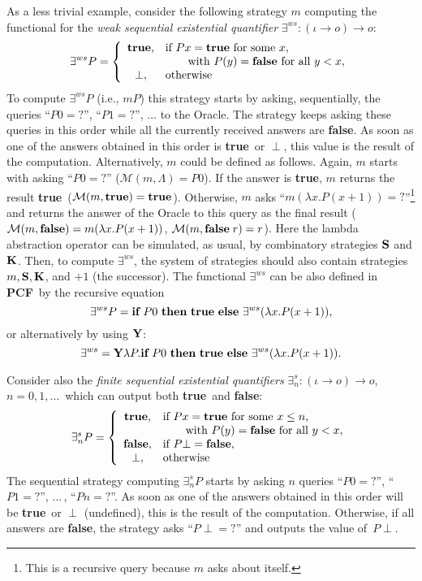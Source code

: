 \documentclass[fleqn]{LMCS}
\theoremstyle{plain}\newtheorem{satz}[thm]{Satz}
\theoremstyle{plain}\newtheorem{hyp}[thm]{Hypothesis}
\theoremstyle{plain}\newtheorem{hyps}[thm]{Hypotheses}
\theoremstyle{definition}\newtheorem{note}[thm]{Note}
\newcommand{\arr}{\rightarrow}
\newcommand{\PCF}{\mbox{\bf PCF}}
\newcommand{\K}{\mbox{\bf K}}
\newcommand{\Ss}{\mbox{\bf S}}
\newcommand{\Y}{\mbox{\bf Y}}
\newcommand{\IF}{\mbox{\bf if}}
\newcommand{\THEN}{\mbox{\bf then}}
\newcommand{\ELSE}{\mbox{\bf else}}
\newcommand{\Undef}{{\perp}}
\newcommand{\MM}{{\mathcal M}}
\newcommand{\?}{\mbox{?}}
\newcommand{\false}{\mbox{\bf false}}
\newcommand{\true}{\mbox{\bf true}}
\begin{document}
As a less trivial example, consider the following strategy $m$  
computing the functional for 
the \emph{weak sequential existential quantifier} 
$\exists^{ws}:(\iota\arr o)\arr o$: 
\[
\exists^{ws} P = \left\{
			\begin{array}{cl}
			\true,  & \mbox{if } Px=\true\mbox{ for some }x, \\
			        & \quad\quad\mbox{with }P(y)=\false\mbox{ for all }y<x,\\
			\Undef, & \mbox{otherwise}
			\end {array}
		  \right.
\]
To compute $\exists^{ws} P$ (i.e., $mP$) 
this strategy starts by asking, sequentially, the queries  
\linebreak
``$P0=\?$'', ``$P1=\?$'', $\ldots$ to the Oracle.
The strategy keeps asking these queries in this order 
while all the currently received answers are \false. 
As soon as one of the answers obtained in this order 
is \true\ or $\Undef$, this value 
is the result of the computation. 
Alternatively, $m$ could be defined as follows. 
Again, $m$ starts with asking 
``$P0=\?$'' ($\MM(m,\Lambda)=P0$). If the answer is \true, 
$m$ returns the result \true\ ($\MM(m,\true)=\true$). 
Otherwise, $m$  
asks ``$m(\lambda x.P(x+1))=\?$''\footnote{This is a recursive query because $m$ asks about itself. 
}
and returns the answer of the Oracle to this query as the final result 
($\MM(m,\false)=m(\lambda x.P(x+1))$, $\MM(m,\false\;r)=r$). 
Here the lambda abstraction operator can be simulated, as usual, 
by combinatory strategies $\Ss$ and $\K$. 
Then, to compute $\exists^{ws}$, the system of strategies should also 
contain strategies $m,\Ss,\K$, and $+1$ (the successor).
The functional $\exists^{ws}$ can be also 
defined in \PCF\ by the recursive equation 
\[
\exists^{ws} P=\IF\ P0\ \THEN\ \true\ \ELSE\ \exists^{ws}(\lambda x.P(x+1)),
\]
or alternatively by using 
$\Y$: 
\[
\exists^{ws}=\Y\lambda P.\IF\ P0\ \THEN\ \true\ \ELSE\ \exists^{ws}(\lambda x.P(x+1)).
\]


Consider also the \emph{finite sequential existential quantifiers} 
$\exists_n^s:(\iota\arr o)\arr o$, $n=0,1,\ldots\,$ which can output 
both \true\ and \false:
\[
\exists_n^s P = \left\{
			\begin{array}{cl}
			\true, & \mbox{if } Px=\true\mbox{ for some }x\le n,\\
				 & \quad\quad\mbox{with }P(y)=\false
							\mbox{ for all }y<x,\\
			\false, & \mbox{if } P\Undef=\false, \\
			\Undef, & \mbox{otherwise}
			\end {array}
		  \right.
\]
The sequential strategy computing $\exists_n^s P$  
starts by asking $n$ queries 
``$P0=\?$'', ``$P1=\?$'', $\ldots\,$, ``$Pn=\?$''. 
As soon as one of the answers obtained in this order 
will be \true\ or $\Undef$ (undefined), this is the result of the computation. 
Otherwise, 
if all answers are \false, the strategy asks 
``$P\Undef=\?$'' and outputs the 
value of~$P\Undef$. 
\end{document}
